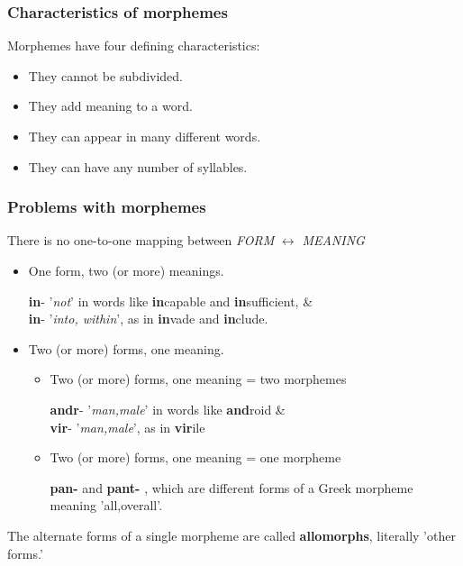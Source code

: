 \documentclass[12pt]{article}
\begin{document}
\subsubsection{Characteristics of morphemes}
Morphemes have four defining characteristics:
\begin{itemize}
\item \color{blue} They cannot be subdivided.
\color{black} \item \color{blue} They add meaning to a word.
\color{black} \item \color{blue} They can appear in many different words.
\color{black} \item \color{blue} They can have any number of syllables.
\end{itemize}
\color{black}

\subsubsection{Problems with morphemes}
There is no one-to-one mapping between \textit{FORM} $\leftrightarrow$ \textit{MEANING}
\begin{itemize}
\item One form, two (or more) meanings.
	\begin{addmargin}[3em]{2em}%
	\color{red}\textbf{in}- \color{blue}'\textit{not}' \color{black}in words like \color{red}\textbf{in}\color{black}capable and \color{red}\textbf{in}\color{black}sufficient, \& \\
	\color{red}\textbf{in}- \color{blue}'\textit{into, within}', \color{black}as in \color{red}\textbf{in}\color{black}vade and \color{red}\textbf{in}\color{black}clude.
	\end{addmargin}

\item Two (or more) forms, one meaning.
\begin{itemize}
\item Two (or more) forms, one meaning = two morphemes
	\begin{addmargin}[3em]{2em}%
	\color{red}\textbf{andr}- \color{blue}'\textit{man,male}' \color{black}in words like \color{red}\textbf{and}\color{black}roid \& \\
	\color{red}\textbf{vir}- \color{blue}'\textit{man,male}', \color{black}as in \color{red}\textbf{vir}\color{black}ile
	\end{addmargin}

\item Two (or more) forms, one meaning = one morpheme
	\begin{addmargin}[3em]{2em}%
		\color{red} \textbf{pan-} \color{black} and \color{red} \textbf{pant-} \color{black}, which are different forms of a Greek morpheme meaning \color{blue}'all,overall'. 
	\end{addmargin}

\end{itemize}
\end{itemize}
The alternate forms of a single morpheme are called \color{blue}\textbf{allomorphs},\color{black} literally 'other forms.' 
\end{document}
